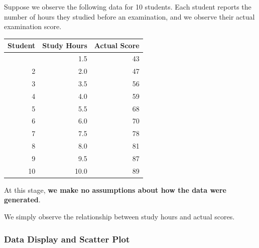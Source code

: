 \documentclass[
  a4paper,
]{article}
\newcounter{none} %
\begin{document}
Suppose we observe the following data for 10 students. Each student
reports the number of hours they studied before an examination, and we
observe their actual examination score.

{\def\LTcaptype{none} %
\begin{longtable}[]{@{}rrr@{}}
\toprule\noalign{}
Student & Study Hours & Actual Score \\
\midrule\noalign{}
\endhead
\bottomrule\noalign{}
\endlastfoot
1 & 1.5 & 43 \\
2 & 2.0 & 47 \\
3 & 3.5 & 56 \\
4 & 4.0 & 59 \\
5 & 5.5 & 68 \\
6 & 6.0 & 70 \\
7 & 7.5 & 78 \\
8 & 8.0 & 81 \\
9 & 9.5 & 87 \\
10 & 10.0 & 89 \\
\end{longtable}
}

At this stage, \textbf{we make no assumptions about how the data were
generated}.

We simply observe the relationship between study hours and actual
scores.

\subsubsection{\texorpdfstring{\textbf{Data Display and Scatter
Plot}}{Data Display and Scatter Plot}}\label{data-display-and-scatter-plot}
\end{document}
